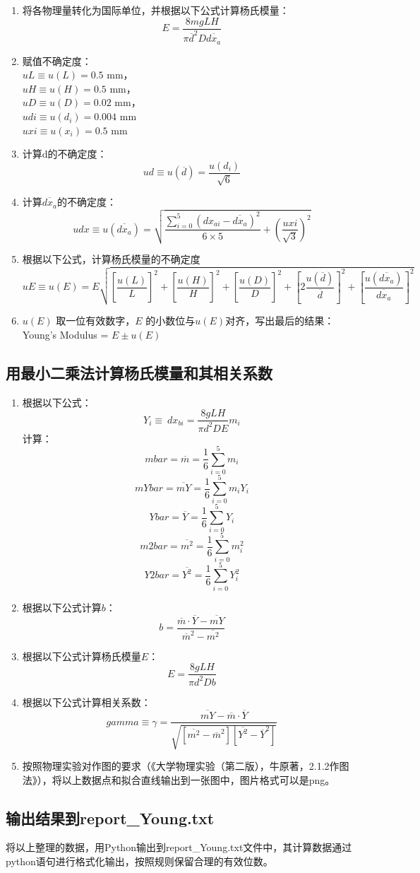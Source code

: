 \begin{enumerate}
  \item 将各物理量转化为国际单位，并根据以下公式计算杨氏模量：$$E = \frac{8mgLH}{\pi \overline{d}^2 D \overline{dx_a} }$$
  \item 赋值不确定度：\\
  $uL \equiv u(L) = 0.5$ mm，\\
  $uH \equiv u(H) = 0.5$ mm，\\
  $uD \equiv u(D) = 0.02$ mm，\\
  $udi \equiv u(d_i) = 0.004$ mm\\
  $uxi  \equiv u(x_i) = 0.5$ mm
  \item 计算d的不确定度：$$ud \equiv u(\overline{d}) = \frac{u(d_i)}{\sqrt{6}} $$
  \item 计算$\overline{dx_a}$的不确定度：
  $$
  udx 
  \equiv u(\overline{dx_a})
  = 
  \sqrt{ 
        \frac{\sum\limits_{i=0}^{5} \left( dx_{ai} - \overline{dx_a} \right)^2}
        {6\times5} 
    + \left( \frac{uxi}{\sqrt{3}} \right)^2
  } $$
  \item 根据以下公式，计算杨氏模量的不确定度
  $$
  uE \equiv u(E) = E
  \sqrt{
  \left[  \frac{u(L)}{L} \right]^2 + 
  \left[  \frac{u(H)}{H} \right]^2 + 
  \left[  \frac{u(D)}{D} \right]^2 + 
  \left[ 2\frac{u(\overline{d})}{\overline{d}} \right]^2 + 
  \left[ \frac{u(\overline{dx_a})}{\overline{dx_a}} \right]^2
  }
  $$
  \item $u(E)$ 取一位有效数字，$E$ 的小数位与$u(E)$对齐，写出最后的结果：Young's Modulus = $E \pm u(E)$
\end{enumerate}

\subsection{用最小二乘法计算杨氏模量和其相关系数}

\begin{enumerate}
  \item 根据以下公式：
  $$Y_i \equiv \ dx_{bi} = \frac{8gLH}{\pi d^2 DE} m_i $$
  计算：
  $$mbar = \overline{m} = \frac{1}{6} \sum\limits_{i=0}^5 m_i$$
  $$mYbar = \overline{mY} = \frac{1}{6} \sum\limits_{i=0}^5 m_i Y_i$$
  $$Ybar = \overline{Y} = \frac{1}{6} \sum\limits_{i=0}^5 Y_i$$
  $$m2bar = \overline{m^2} = \frac{1}{6} \sum\limits_{i=0}^5 m_i^2$$
  $$Y2bar = \overline{Y^2} = \frac{1}{6} \sum\limits_{i=0}^5 Y_i^2$$
  \item 根据以下公式计算$b$：
  $$b = \frac{\overline{m}\cdot \overline{Y} - \overline{mY}}{\overline{m}^2 - \overline{m^2}}$$
   \item 根据以下公式计算杨氏模量$E$：
  $$E = \frac{8gLH}{\pi d^2 Db}$$
  \item 根据以下公式计算相关系数：
  $$gamma \equiv \gamma = 
  \frac{\overline{mY} - \overline{m} \cdot\overline{Y} }
  {\sqrt{\left[ \overline{m^2} - \overline{m}^2 \right] \left[ \overline{Y^2} - \overline{Y}^2 \right]}}$$
  \item 按照物理实验对作图的要求（《大学物理实验（第二版），牛原著，2.1.2作图法》），将以上数据点和拟合直线输出到一张图中，图片格式可以是png。
\end{enumerate}

\subsection{输出结果到report\_Young.txt}

将以上整理的数据，用Python输出到report\_Young.txt文件中，其计算数据通过python语句进行格式化输出，按照规则保留合理的有效位数。